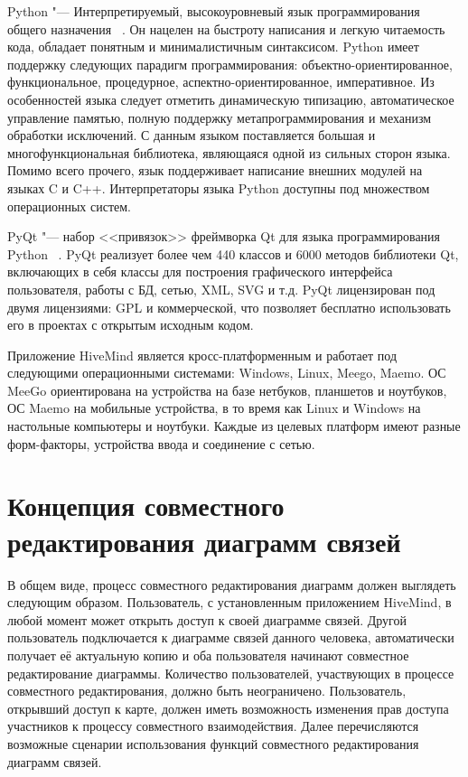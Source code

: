 Python "--- Интерпретируемый, высокоуровневый язык программирования общего
назначения ~\cite{python}. Он нацелен на быстроту написания и легкую читаемость
кода, обладает понятным и минималистичным синтаксисом. Python имеет поддержку
следующих парадигм программирования: объектно-ориентированное, функциональное,
процедурное, аспектно-ориентированное, императивное. Из особенностей языка
следует отметить динамическую типизацию, автоматическое управление памятью,
полную поддержку метапрограммирования и механизм обработки исключений. С данным
языком поставляется большая и многофункциональная библиотека, являющаяся одной
из сильных сторон языка. Помимо всего прочего, язык поддерживает написание
внешних модулей на языках C и C++. Интерпретаторы языка Python доступны под
множеством операционных систем.

PyQt "--- набор <<привязок>> фреймворка Qt для языка программирования Python
~\cite{pyqt4}. PyQt реализует более чем 440 классов и 6000 методов библиотеки
Qt, включающих в себя классы для построения графического интерфейса
пользователя, работы с БД, сетью, XML, SVG и т.д. PyQt лицензирован под двумя
лицензиями: GPL и коммерческой, что позволяет бесплатно использовать его в
проектах с открытым исходным кодом.

Приложение HiveMind является кросс-платформенным и работает под следующими
операционными системами: Windows, Linux, Meego, Maemo. ОС MeeGo ориентирована на
устройства на базе нетбуков, планшетов и ноутбуков, ОС Maemo на мобильные
устройства, в то время как Linux и Windows на настольные компьютеры и ноутбуки.
Каждые из целевых платформ имеют разные форм-факторы, устройства ввода и
соединение с сетью.


\section{Концепция совместного редактирования диаграмм связей}
\label{sec:collaborative_mindmapping}
В общем виде, процесс совместного редактирования диаграмм должен выглядеть
следующим образом. Пользователь, с установленным приложением HiveMind, в любой
момент может открыть доступ к своей диаграмме связей. Другой пользователь
подключается к диаграмме связей данного человека, автоматически получает её
актуальную копию и оба пользователя начинают совместное редактирование
диаграммы. Количество пользователей, участвующих в процессе совместного
редактирования, должно быть неограничено. Пользователь, открывший доступ к
карте, должен иметь возможность изменения прав доступа участников к процессу
совместного взаимодействия. Далее перечисляются возможные сценарии использования
функций совместного редактирования диаграмм связей.

